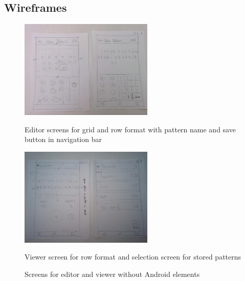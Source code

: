 \documentclass[a4paper,11pt]{kth-mag}
\begin{document}
\subsection{Wireframes}
\begin{figure}
\centering
\begin{minipage}{.5\textwidth}
  \centering
  \includegraphics[width=2.5in]{images/image09.jpg}
  \caption{Editor screens for grid and row format with pattern name and save button in navigation bar}
  \label{fig_wireframe1}
\end{minipage}

\begin{minipage}{.5\textwidth}
  \centering
  \includegraphics[width=2.5in]{images/image08.jpg}
  \caption{Viewer screen for row format and selection screen for stored patterns}
  \label{fig_wireframe2}
\end{minipage}
\caption{Screens for editor and viewer without Android elements}
\end{figure}
\end{document}
